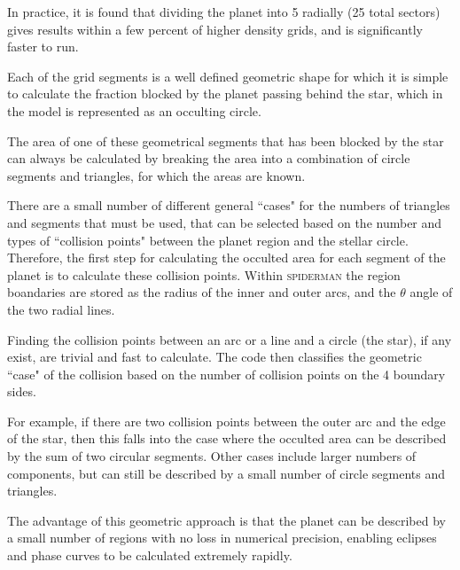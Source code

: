 \documentclass[a4paper,fleqn,usenatbib]{mnras}
\begin{document}
In practice, it is found that dividing the planet into 5 radially (25 total sectors) gives results within a few percent of higher density grids, and is significantly faster to run.

Each of the grid segments is a well defined geometric shape for which it is simple to calculate the fraction blocked by the planet passing behind the star, which in the model is represented as an occulting circle.

The area of one of these geometrical segments that has been blocked by the star can always be calculated by breaking the area into a combination of circle segments and triangles, for which the areas are known.

There are a small number of different general ``cases" for the numbers of triangles and segments that must be used, that can be selected based on the number and types of ``collision points" between the planet region and the stellar circle. Therefore, the first step for calculating the occulted area for each segment of the planet is to calculate these collision points. Within \textsc{spiderman} the region boandaries are stored as the radius of the inner and outer arcs, and the $\theta$ angle of the two radial lines.

Finding the collision points between an arc or a line and a circle (the star), if any exist, are trivial and fast to calculate. The code then classifies the geometric ``case" of the collision based on the number of collision points on the 4 boundary sides.

For example, if there are two collision points between the outer arc and the edge of the star, then this falls into the case where the occulted area can be described by the sum of two circular segments. Other cases include larger numbers of components, but can still be described by a small number of circle segments and triangles.

The advantage of this geometric approach is that the planet can be described by a small number of regions with no loss in numerical precision, enabling eclipses and phase curves to be calculated extremely rapidly.
\end{document}
